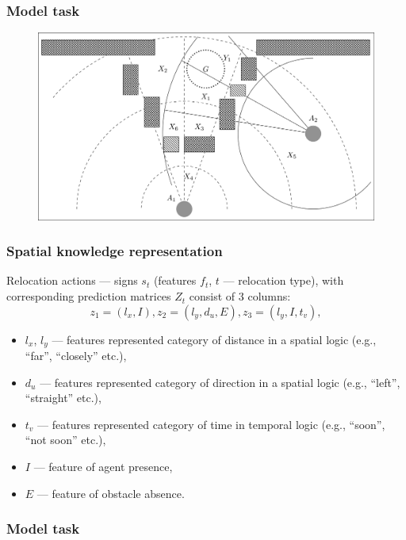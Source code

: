 \documentclass[default]{beamer}
\begin{document}
	\begin{frame}
		\frametitle{Model task}
		
		\begin{figure}
			\includegraphics[width=\textwidth]{examples/rita_ex_proc.png}
		\end{figure}
	\end{frame}

	\begin{frame}
		\frametitle{Spatial knowledge representation}
		
		Relocation actions --- signs $s_t$ (features $f_t$, $t$ --- relocation type), with corresponding prediction matrices $Z_t$ consist of 3 columns:
		\[
		z_1=(l_x, I), z_2=(l_y, d_u, E), z_3=(l_y, I, t_v),
		\]
		\begin{itemize}
			\item $l_x$, $l_y$ --- features represented category of distance in a spatial logic (e.g., ``far'', ``closely'' etc.), 
			\item $d_u$ --- features represented category of direction in a spatial logic (e.g., ``left'', ``straight'' etc.), 
			\item $t_v$ --- features represented category of time in temporal logic (e.g., ``soon'', ``not soon'' etc.),
			\item $I$ --- feature of agent presence, 
			\item $E$ --- feature of obstacle absence.
		\end{itemize}
	\end{frame}
			
	\begin{frame}
		\frametitle{Model task}
		\begin{center}
		\end{center}
	\end{frame}
\end{document}
